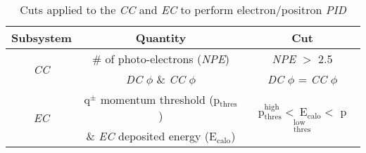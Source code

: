\begin{table}[h!]
\begin{minipage}{\textwidth}
\begin{center}
\begin{singlespacing}

\caption[Electron/Positron PID Cuts]{\label{tab:ISLEP_cuts}Cuts applied to the \emph{CC} and \emph{EC} to perform electron/positron \emph{PID} \vspace{0.75mm}}

\begin{tabular}{c|c|c}

\hline
Subsystem & Quantity & Cut \\
\hline
\multirow{2}{*}{\emph{CC}}  & \# of photo-electrons (\emph{NPE})  & \emph{NPE} $>$ 2.5 \\
 &  \emph{DC} $\phi$ \& \emph{CC} $\phi$  & \emph{DC} $\phi$ = \emph{CC} $\phi$ \\
\hline
\multirow{2}{*}{\emph{EC}}  & q$^{\pm}$ momentum threshold (p$\mathrm{_{thres}}$) & \multirow{2}{*}{p$\mathrm{_{thres}^{high}} < \ $E$\mathrm{_{calo}} <$ p$\mathrm{_{thres}^{low}}$ } \\
&  \& \emph{EC} deposited energy (E$\mathrm{_{calo}}$) & \\
\hline \hline
\end{tabular}
\end{singlespacing}
\end{center}
\end{minipage}
\end{table}

